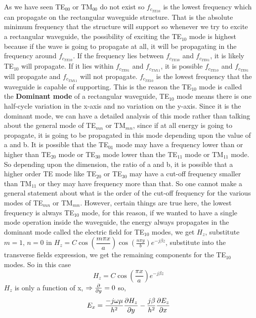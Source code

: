 As we have seen TE$_{00}$ or TM$_{00}$ do not exist so $f_{c_{TE{10}}}$ is the lowest frequency which can propagate on the rectangular waveguide structure. That is the absolute minimum frequency that the structure will support so whenever we try to excite a rectangular waveguide, the possibility of exciting the TE$_{10}$ mode is highest because if the wave is going to propagate at all, it will be propagating in the frequency around $f_{c_{TE{10}}}$. If the frequency lies between $f_{c_{TE{10}}}$ and $f_{c_{TE{01}}}$, it is likely TE$_{10}$ will propagate. If it lies within $f_{c_{TE{01}}}$ and $f_{c_{TM{11}}}$, it is possible  $f_{c_{TE{10}}}$ and $f_{c_{TE{01}}}$ will propagate and $f_{c_{TM{11}}}$ will not propagate. $f_{c_{TE{10}}}$ is the lowest frequency that the waveguide is capable of supporting. This is the reason the TE$_{10}$ mode is called the \textbf{Dominant mode} of a rectangular waveguide, TE$_{10}$ mode means there is one half-cycle variation in the x-axis and no variation on the y-axis. Since it is the dominant mode, we can have a detailed analysis of this mode rather than talking about the general mode of TE$_{mn}$ or TM$_{mn}$, since if at all energy is going to propagate, it is going to be propagated in this mode depending upon the value of a and b. It is possible that the TE$_{01}$ mode may have a frequency lower than or higher than TE$_{20}$ mode or TE$_{30}$ mode lower than the TE$_{11}$ mode or TM$_{11}$ mode. So depending upon the dimension, the ratio of a and b, it is possible that a higher order TE mode like TE$_{20}$ or TE$_{30}$ may have a cut-off frequency smaller than TM$_{11}$ or they may have frequency more than that. So one cannot make a general statement about what is the order of the cut-off frequency for the various modes of TE$_{mn}$ or TM$_{mn}$. However, certain things are true here, the lowest frequency is always TE$_{10}$ mode, for this reason, if we wanted to have a single mode operation inside the waveguide, the energy always propagates in the dominant mode called the electric field for TE$_{10}$ modes, we get $H_z$, substitute $m=1$, $n=0$ in $H_z = C \cos(\dfrac{m\pi x}{a})\cos(\frac{n\pi y}{b})e^{-j\beta z}$, substitute into the transverse fields expression, we get the remaining components for the TE$_{10}$ modes. So in this case
\begin{dmath*}
H_z = C\cos(\frac{\pi x}{a})e^{-j\beta z}
\end{dmath*}
$H_z$ is only a function of x, $\Rightarrow \pdv{}{y} = 0$ so,
\begin{dmath*}
E_x = \frac{-j\omega\mu}{h^2}\pdv{H_z}{y} - \frac{j\beta}{h^2}\pdv{E_z}{x}
\end{dmath*}
